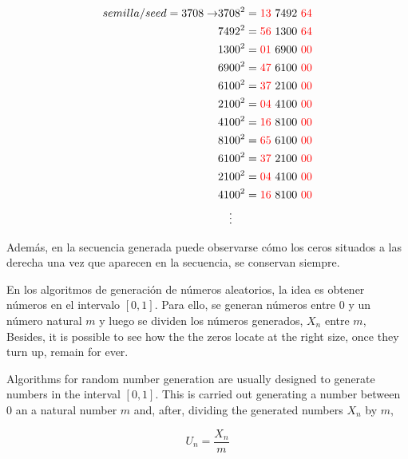 \begin{align*}
semilla/seed=3708 \rightarrow
&3708^2={\color{red}13}\ 7492\ {\color{red}64}\\
&7492^2={\color{red}56}\ 1300\ {\color{red}64}\\
&1300^2={\color{red}01}\ 6900\ {\color{red}00}\\
&6900^2={\color{red}47}\ 6100\ {\color{red}00}\\
&6100^2={\color{red}37}\ 2100\ {\color{red}00}\\
&2100^2={\color{red}04}\ 4100\ {\color{red}00}\\
&4100^2={\color{red}16}\ 8100\ {\color{red}00}\\
&8100^2={\color{red}65}\ 6100\ {\color{red}00}\\
&6100^2={\color{red}37}\ 2100\ {\color{red}00}\\
&2100^2={\color{red}04}\ 4100\ {\color{red}00}\\
&4100^2={\color{red}16}\ 8100\ {\color{red}00}\\
&\ \ \ \vdots
\end{align*}

\begin{paracol}{2}
Además, en la secuencia generada puede observarse cómo los ceros situados a las derecha una vez que aparecen en la secuencia, se conservan siempre.

En los algoritmos de generación de números aleatorios, la idea es obtener números en el intervalo $[0,1]$. Para ello, se generan números entre $0$ y un número natural $m$ y luego se dividen los números generados, $X_n$ entre $m$,
\switchcolumn
Besides, it is possible to see how the the zeros locate at the right size, once they turn up, remain for ever.

Algorithms for random number generation are usually designed to generate numbers in the interval $[0,1]$. This is carried out generating a number between $0$ an a natural number $m$ and, after, dividing the generated numbers $X_n$ by $m$,  
\end{paracol}

\begin{equation*}
U_n=\frac{X_n}{m}
\end{equation*}

